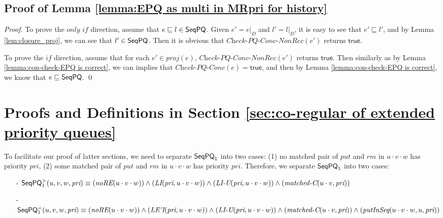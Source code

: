\subsection{Proof of Lemma \ref{lemma:EPQ as multi in MRpri for history}}

\EPQasMultiInMRpriforHistory*

\begin {proof} 

To prove the $\textit{only if}$ direction, assume that $e \sqsubseteq l \in \mathsf{SeqPQ}$. Given $e' = e \vert_{D}$ and $l' = l \vert_{D}$, it is easy to see that $e' \sqsubseteq l'$, and by Lemma \ref{lem:closure_proj}, we can see that $l' \in \mathsf{SeqPQ}$. Then it is obvious that $\textit{Check-PQ-Conc-NonRec}(e')$ returns $\mathsf{true}$. 

To prove the $\textit{if}$ direction, assume that for each $e' \in \textit{proj}(e)$, $\textit{Check-PQ-Conc-NonRec}(e')$ returns $\mathsf{true}$. Then similarly as by Lemma \ref{lemma:con-check-EPQ is correct}, we can implies that $\textit{Check-PQ-Conc}(e)=\mathsf{true}$, and then by Lemma \ref{lemma:con-check-EPQ is correct}, we know that $e \sqsubseteq \mathsf{SeqPQ}$. \qed
\end {proof}







\section{Proofs and Definitions in Section \ref{sec:co-regular of extended priority queues}}
\label{sec:appendix proof and definition in section co-regular of extended priority queues}

To facilitate our proof of latter sections, we need to separate $\mathsf{SeqPQ}_1$ into two cases: (1) no matched pair of $\textit{put}$ and $\textit{rm}$ in $u \cdot v \cdot w$ has priority $\textit{pri}$, (2) some matched pair of $\textit{put}$ and $\textit{rm}$ in $u \cdot v \cdot w$ has priority $\textit{pri}$.  Therefore, we separate $\mathsf{SeqPQ}_1$ into two cases:

\begin{itemize}
\setlength{\itemsep}{0.5pt}
\item[-] $\mathsf{SeqPQ}_1^{>}(u,v,w,\textit{pri}) \equiv
(\textit{noRE}(u \cdot v \cdot w)) \wedge
(\textit{LI}(\textit{pri}, u \cdot v \cdot w)) \wedge
(\textit{LI-U}(\textit{pri},u \cdot v \cdot w)) \wedge
(\textit{matched-C}(u \cdot v,\textit{pri}) )$


\item[-] $\mathsf{SeqPQ}_1^{=}(u,v,w,\textit{pri}) \equiv
(\textit{noRE}(u \cdot v \cdot w)) \wedge
(\textit{LE'I}(\textit{pri}, u \cdot v \cdot w)) \wedge
(\textit{LI-U}(\textit{pri},u \cdot v \cdot w)) \wedge
(\textit{matched-C}(u \cdot v,\textit{pri}) ) \wedge
(\textit{putInSeq}(u \cdot v \cdot w,u,\textit{pri}))$
\end{itemize}


